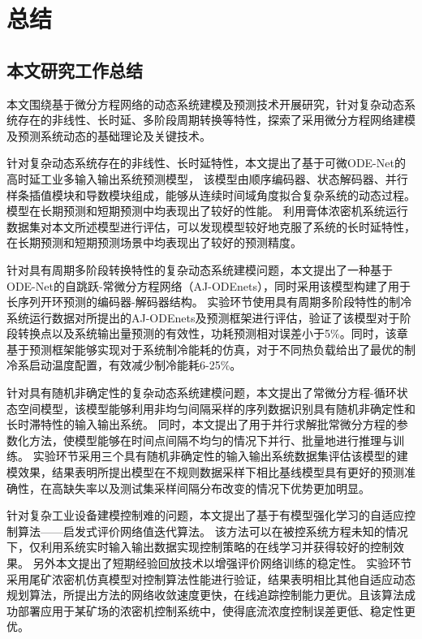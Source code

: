 \chapter{总结}
\section{本文研究工作总结}
本文围绕基于微分方程网络的动态系统建模及预测技术开展研究，针对复杂动态系统存在的非线性、长时延、多阶段周期转换等特性，探索了采用微分方程网络建模及预测系统动态的基础理论及关键技术。

针对复杂动态系统存在的非线性、长时延特性，本文提出了基于可微ODE-Net的高时延工业多输入输出系统预测模型，
该模型由顺序编码器、状态解码器、并行样条插值模块和导数模块组成，能够从连续时间域角度拟合复杂系统的动态过程。模型在长期预测和短期预测中均表现出了较好的性能。
利用膏体浓密机系统运行数据集对本文所述模型进行评估，可以发现模型较好地克服了系统的长时延特性，在长期预测和短期预测场景中均表现出了较好的预测精度。

针对具有周期多阶段转换特性的复杂动态系统建模问题，本文提出了一种基于ODE-Net的自跳跃-常微分方程网络（AJ-ODEnets），同时采用该模型构建了用于长序列开环预测的编码器-解码器结构。
实验环节使用具有周期多阶段特性的制冷系统运行数据对所提出的AJ-ODEnets及预测框架进行评估，验证了该模型对于阶段转换点以及系统输出量预测的有效性，功耗预测相对误差小于5\%。同时，该章基于预测框架能够实现对于系统制冷能耗的仿真，对于不同热负载给出了最优的制冷系启动温度配置，有效减少制冷能耗6-25\%。

针对具有随机非确定性的复杂动态系统建模问题，本文提出了常微分方程-循环状态空间模型，该模型能够利用非均匀间隔采样的序列数据识别具有随机非确定性和长时滞特性的输入输出系统。
同时，本文提出了用于并行求解批常微分方程的参数化方法，使模型能够在时间点间隔不均匀的情况下并行、批量地进行推理与训练。
实验环节采用三个具有随机非确定性的输入输出系统数据集评估该模型的建模效果，结果表明所提出模型在不规则数据采样下相比基线模型具有更好的预测准确性，在高缺失率以及测试集采样间隔分布改变的情况下优势更加明显。

针对复杂工业设备建模控制难的问题，本文提出了基于有模型强化学习的自适应控制算法——启发式评价网络值迭代算法。
该方法可以在被控系统方程未知的情况下，仅利用系统实时输入输出数据实现控制策略的在线学习并获得较好的控制效果。
另外本文提出了短期经验回放技术以增强评价网络训练的稳定性。
实验环节采用尾矿浓密机仿真模型对控制算法性能进行验证，结果表明相比其他自适应动态规划算法，所提出方法的网络收敛速度更快，在线追踪控制能力更优。且该算法成功部署应用于某矿场的浓密机控制系统中，使得底流浓度控制误差更低、稳定性更优。


